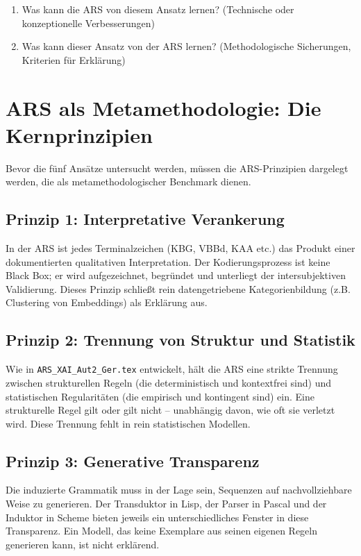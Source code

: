 \documentclass[12pt,a4paper]{article}
\begin{document}
\begin{enumerate}
    \item Was kann die ARS von diesem Ansatz lernen? (Technische oder konzeptionelle 
    Verbesserungen)
    
    \item Was kann dieser Ansatz von der ARS lernen? (Methodologische Sicherungen, 
    Kriterien für Erklärung)
\end{enumerate}

\section{ARS als Metamethodologie: Die Kernprinzipien}

Bevor die fünf Ansätze untersucht werden, müssen die ARS-Prinzipien dargelegt 
werden, die als metamethodologischer Benchmark dienen.

\subsection{Prinzip 1: Interpretative Verankerung}

In der ARS ist jedes Terminalzeichen (KBG, VBBd, KAA etc.) das Produkt einer 
dokumentierten qualitativen Interpretation. Der Kodierungsprozess ist keine 
Black Box; er wird aufgezeichnet, begründet und unterliegt der intersubjektiven 
Validierung. Dieses Prinzip schließt rein datengetriebene Kategorienbildung 
(z.B. Clustering von Embeddings) als Erklärung aus.

\subsection{Prinzip 2: Trennung von Struktur und Statistik}

Wie in \texttt{ARS\_XAI\_Aut2\_Ger.tex} entwickelt, hält die ARS eine strikte 
Trennung zwischen strukturellen Regeln (die deterministisch und kontextfrei 
sind) und statistischen Regularitäten (die empirisch und kontingent sind) ein. 
Eine strukturelle Regel gilt oder gilt nicht – unabhängig davon, wie oft sie 
verletzt wird. Diese Trennung fehlt in rein statistischen Modellen.

\subsection{Prinzip 3: Generative Transparenz}

Die induzierte Grammatik muss in der Lage sein, Sequenzen auf nachvollziehbare 
Weise zu generieren. Der Transduktor in Lisp, der Parser in Pascal und der 
Induktor in Scheme bieten jeweils ein unterschiedliches Fenster in diese 
Transparenz. Ein Modell, das keine Exemplare aus seinen eigenen Regeln 
generieren kann, ist nicht erklärend.
\end{document}
